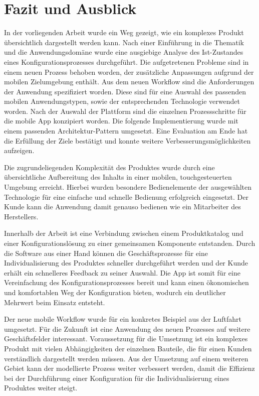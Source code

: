 \chapter{Fazit und Ausblick}\label{chapter_7}
In der vorliegenden Arbeit wurde ein Weg gezeigt, wie ein komplexes Produkt übersichtlich dargestellt werden kann. Nach einer Einführung in die Thematik und die Anwendungsdomäne wurde eine ausgiebige Analyse des Ist-Zustandes eines Konfigurationsprozesses durchgeführt. Die aufgetretenen Probleme sind in einem neuen Prozess behoben worden, der zusätzliche Anpassungen aufgrund der mobilen Zielumgebung enthält. Aus dem neuen Workflow sind die Anforderungen der Anwendung spezifiziert worden. Diese sind für eine Auswahl des passenden mobilen Anwendungstypen, sowie der entsprechenden Technologie verwendet worden. Nach der Auswahl der Plattform sind die einzelnen Prozessschritte für die mobile App konzipiert worden. Die folgende Implementierung wurde mit einem passenden Architektur-Pattern umgesetzt. Eine Evaluation am Ende hat die Erfüllung der Ziele bestätigt und konnte weitere Verbesserungsmöglichkeiten aufzeigen.

Die zugrundeliegenden Komplexität des Produktes wurde durch eine übersichtliche Aufbereitung des Inhalts in einer mobilen, touchgesteuerten Umgebung erreicht. Hierbei wurden besondere Bedienelemente der ausgewählten Technologie für eine einfache und schnelle Bedienung erfolgreich eingesetzt. Der Kunde kann die Anwendung damit genauso bedienen wie ein Mitarbeiter des Herstellers. 

Innerhalb der Arbeit ist eine Verbindung zwischen einem Produktkatalog und einer Konfigurationslösung zu einer gemeinsamen Komponente entstanden.  Durch die Software aus einer Hand können die Geschäftsprozesse für eine Individualisierung des Produktes schneller durchgeführt werden und der Kunde erhält ein schnelleres Feedback zu seiner Auswahl. Die App ist somit für eine Vereinfachung des Konfigurationsprozesses bereit und kann einen ökonomischen und komfortablen Weg der Konfiguration bieten, wodurch ein deutlicher Mehrwert beim Einsatz entsteht.  \par 

Der neue mobile Workflow wurde für ein konkretes Beispiel aus der Luftfahrt umgesetzt. Für die Zukunft ist eine Anwendung des neuen Prozesses auf weitere Geschäftsfelder interessant. Voraussetzung für die Umsetzung ist ein komplexes Produkt mit vielen Abhängigkeiten der einzelnen Bauteile, die für einen Kunden verständlich dargestellt werden müssen. Aus der Umsetzung auf einem weiteren Gebiet kann der modellierte Prozess weiter verbessert werden, damit die Effizienz bei der Durchführung einer Konfiguration für die Individualisierung eines Produktes weiter steigt.
